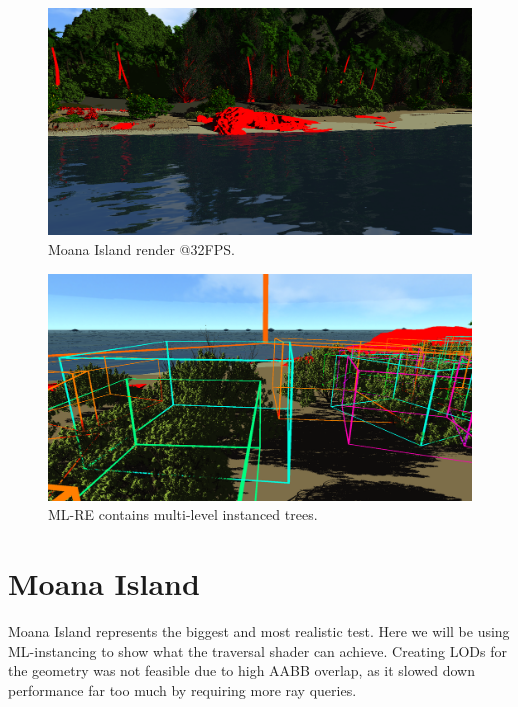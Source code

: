 \newpage
\begin{figure}
    \centering
    \includegraphics[width=.7\textwidth]{images/testing/Moana Render.PNG}
    \caption{Moana Island render @32FPS.}
    \label{fig:MoanaRender}
\end{figure}

\begin{figure}
    \centering
    \includegraphics[width=.7\textwidth]{images/testing/Moana ML-RE AABB.PNG}
    \caption{ML-RE contains multi-level instanced trees.}
    \label{fig:MoanaRenderAABBs}
\end{figure}
\section{Moana Island}
\label{sec:MOANATEST}
Moana Island represents the biggest and most realistic test. Here we will be using ML-instancing to show what the traversal shader can achieve. Creating LODs for the geometry was not feasible due to high AABB overlap, as it slowed down performance far too much by requiring more ray queries.
